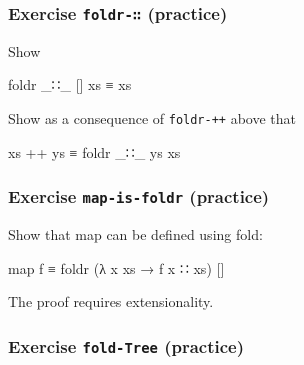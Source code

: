\begin{fence}
\begin{code}%
\>[0]\<%
\end{code}
\end{fence}

\hypertarget{exercise-foldr--practice}{%
\subsubsection{\texorpdfstring{Exercise \texttt{foldr-∷}
(practice)}{Exercise foldr-∷ (practice)}}\label{exercise-foldr--practice}}

Show

\begin{myDisplay}
foldr _∷_ [] xs ≡ xs
\end{myDisplay}

Show as a consequence of \texttt{foldr-++} above that

\begin{myDisplay}
xs ++ ys ≡ foldr _∷_ ys xs
\end{myDisplay}

\begin{fence}
\begin{code}%
\>[0]\<%
\end{code}
\end{fence}

\hypertarget{exercise-map-is-foldr-practice}{%
\subsubsection{\texorpdfstring{Exercise \texttt{map-is-foldr}
(practice)}{Exercise map-is-foldr (practice)}}\label{exercise-map-is-foldr-practice}}

Show that map can be defined using fold:

\begin{myDisplay}
map f ≡ foldr (λ x xs → f x ∷ xs) []
\end{myDisplay}

The proof requires extensionality.

\begin{fence}
\begin{code}%
\>[0]\<%
\end{code}
\end{fence}

\hypertarget{exercise-fold-tree-practice}{%
\subsubsection{\texorpdfstring{Exercise \texttt{fold-Tree}
(practice)}{Exercise fold-Tree (practice)}}\label{exercise-fold-tree-practice}}

